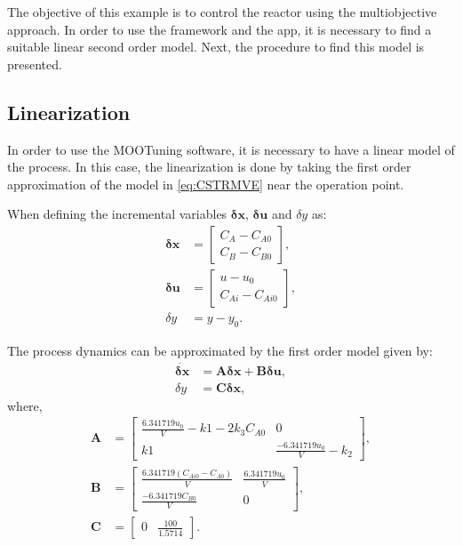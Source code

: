 The objective of this example is to control the reactor using the multiobjective approach. In order to use the framework and the \matlab{} app, it is necessary to find a suitable linear second order model. Next, the procedure to find this model is presented.

\subsection{Linearization}
\label{sec:CSTRLin}
In order to use the MOOTuning software, it is necessary to have a linear model of the process. In this case, the linearization is done by taking the first order approximation of the model in \eqref{eq:CSTRMVE} near the operation point.

When defining the incremental variables $\mathbf{\delta x}$, $\mathbf{\delta u}$ and $\delta y$ as:
\begin{align*}
\mathbf{\delta x} &= \left[ \begin{array}{c} C_A - C_{A0} \\ C_B - C_{B0} \end{array} \right], \\
\mathbf{\delta u} &= \left[ \begin{array}{c} u-u_0 \\ C_{Ai} - C_{Ai0} \end{array} \right], \\
\delta y &= y - y_0 .
\end{align*}

The process dynamics can be approximated by the first order model given by:
%
\begin{align}
\dot{\mathbf{\delta x}} &=  \mathbf{A}\mathbf{\delta x} + \mathbf{B} \mathbf{\delta u}, \\
%
\delta y &=  \mathbf{C} \mathbf{\delta x},
\end{align}
%
where,
\begin{align*}
	\mathbf{A} &= \left[ \begin{array}{cc} \frac{6.341719 u_0}{V} - k1 - 2 k_3 C_{A0} & 0 \\ k1 & \frac{-6.341719 u_0}{V} - k_2 \end{array}\right],\\
	\mathbf{B} &= \left[ \begin{array}{cc} \frac{6.341719 (C_{Ai0}-C_{A0})}{V} & \frac{6.341719 u_0}{V} \\ \frac{-6.341719 C_{B0}}{V} & 0 \end{array} \right], \\
	\mathbf{C} &= \left[ \begin{array}{cc} 0 & \frac{100}{1.5714} \end{array} \right].
\end{align*}

